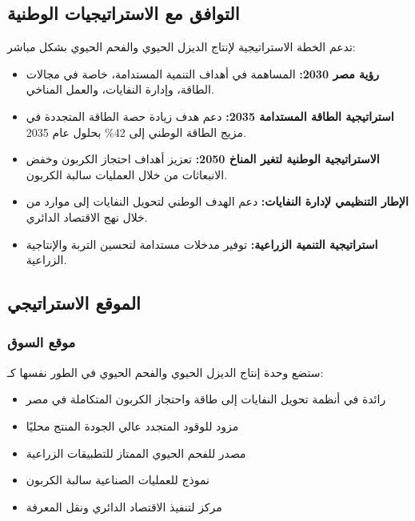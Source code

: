 \subsection{التوافق مع الاستراتيجيات الوطنية}

تدعم الخطة الاستراتيجية لإنتاج الديزل الحيوي والفحم الحيوي بشكل مباشر:

\begin{itemize}
    \item \textbf{رؤية مصر 2030:} المساهمة في أهداف التنمية المستدامة، خاصة في مجالات الطاقة، وإدارة النفايات، والعمل المناخي.
    
    \item \textbf{استراتيجية الطاقة المستدامة 2035:} دعم هدف زيادة حصة الطاقة المتجددة في مزيج الطاقة الوطني إلى 42\% بحلول عام 2035.
    
    \item \textbf{الاستراتيجية الوطنية لتغير المناخ 2050:} تعزيز أهداف احتجاز الكربون وخفض الانبعاثات من خلال العمليات سالبة الكربون.
    
    \item \textbf{الإطار التنظيمي لإدارة النفايات:} دعم الهدف الوطني لتحويل النفايات إلى موارد من خلال نهج الاقتصاد الدائري.
    
    \item \textbf{استراتيجية التنمية الزراعية:} توفير مدخلات مستدامة لتحسين التربة والإنتاجية الزراعية.
\end{itemize}

\subsection{الموقع الاستراتيجي}

\subsubsection{موقع السوق}
ستضع وحدة إنتاج الديزل الحيوي والفحم الحيوي في الطور نفسها كـ:

\begin{itemize}
    \item رائدة في أنظمة تحويل النفايات إلى طاقة واحتجاز الكربون المتكاملة في مصر
    \item مزود للوقود المتجدد عالي الجودة المنتج محليًا
    \item مصدر للفحم الحيوي الممتاز للتطبيقات الزراعية
    \item نموذج للعمليات الصناعية سالبة الكربون
    \item مركز لتنفيذ الاقتصاد الدائري ونقل المعرفة
\end{itemize}

